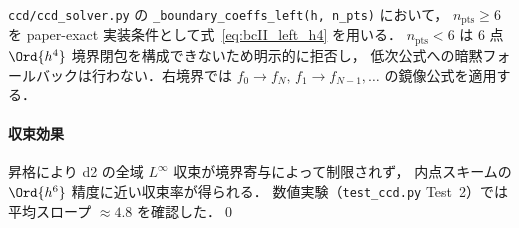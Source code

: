 \texttt{ccd/ccd\_solver.py} の \texttt{\_boundary\_coeffs\_left(h, n\_pts)} において，
$n_\mathrm{pts} \ge 6$ を paper-exact 実装条件として式~\eqref{eq:bcII_left_h4} を用いる．
$n_\mathrm{pts} < 6$ は 6 点 $\Ord{h^4}$ 境界閉包を構成できないため明示的に拒否し，
低次公式への暗黙フォールバックは行わない．右境界では
$f_0 \to f_N,\, f_1 \to f_{N-1},\ldots$ の鏡像公式を適用する．

\paragraph{収束効果}

昇格により d2 の全域 $L^\infty$ 収束が境界寄与によって制限されず，
内点スキームの $\Ord{h^6}$ 精度に近い収束率が得られる．
数値実験（\texttt{test\_ccd.py} Test~2）では平均スロープ ${\approx}4.8$ を確認した．\qed
